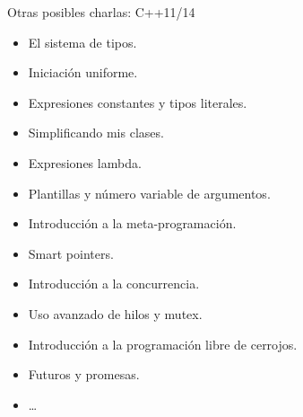 \begin{frame}[t]{Otras posibles charlas: C++11/14}
\begin{itemize}
  \item El sistema de tipos.
  \item Iniciación uniforme.
  \item Expresiones constantes y tipos literales.
  \item Simplificando mis clases.
  \item Expresiones lambda.
  \item Plantillas y número variable de argumentos.
  \item Introducción a la meta-programación.
  \item Smart pointers.
  \item Introducción a la concurrencia.
  \item Uso avanzado de hilos y mutex.
  \item Introducción a la programación libre de cerrojos.
  \item Futuros y promesas.
  \item \ldots
\end{itemize}
\end{frame}
